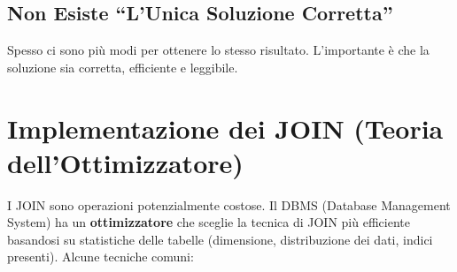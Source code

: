 \subsection{Non Esiste ``L'Unica Soluzione Corretta''}
Spesso ci sono più modi per ottenere lo stesso risultato. L'importante è che la soluzione sia corretta, efficiente e leggibile.\section{Implementazione dei JOIN (Teoria dell'Ottimizzatore)}
I JOIN sono operazioni potenzialmente costose. Il DBMS (Database Management System) ha un \textbf{ottimizzatore} che sceglie la tecnica di JOIN più efficiente basandosi su statistiche delle tabelle (dimensione, distribuzione dei dati, indici presenti). Alcune tecniche comuni:

